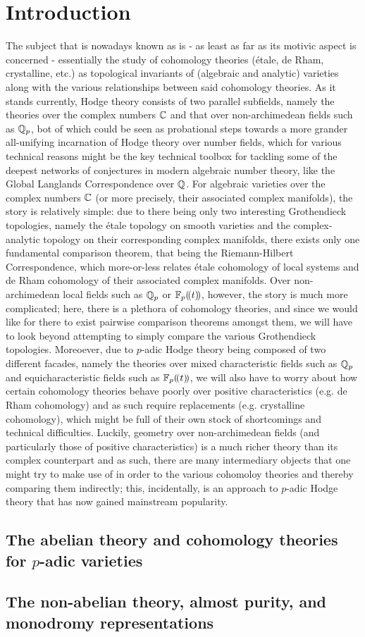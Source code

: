 \chapter{Introduction}
    The subject that is nowadays known as  is - as least as far as its motivic aspect is concerned - essentially the study of cohomology theories (\'etale, de Rham, crystalline, etc.) as topological invariants of (algebraic and analytic) varieties along with the various relationships between said cohomology theories. As it stands currently, Hodge theory consists of two parallel subfields, namely the theories over the complex numbers $\mathbb{C}$ and that over non-archimedean fields such as $\mathbb{Q}_p$, bot of which could be seen as probational steps towards a more grander all-unifying incarnation of Hodge theory over number fields, which for various technical reasons might be the key technical toolbox for tackling some of the deepest networks of conjectures in modern algebraic number theory, like the Global Langlands Correspondence over $\mathbb{Q}$. For algebraic varieties over the complex numbers $\mathbb{C}$ (or more precisely, their associated complex manifolds), the story is relatively simple: due to there being only two interesting Grothendieck topologies, namely the \'etale topology on smooth varieties and the complex-analytic topology on their corresponding complex manifolds, there exists only one fundamental comparison theorem, that being the Riemann-Hilbert Correspondence, which more-or-less relates \'etale cohomology of local systems and de Rham cohomology of their associated complex manifolds. Over non-archimedean local fields such as $\mathbb{Q}_p$ or $\mathbb{F}_p(\!(t)\!)$, however, the story is much more complicated; here, there is a plethora of cohomology theories, and since we would like for there to exist pairwise comparison theorems amongst them, we will have to look beyond attempting to simply compare the various Grothendieck topologies. Moreoever, due to $p$-adic Hodge theory being composed of two different facades, namely the theories over mixed characteristic fields such as $\mathbb{Q}_p$ and equicharacteristic fields such as $\mathbb{F}_p(\!(t)\!)$, we will also have to worry about how certain cohomology theories behave poorly over positive characteristics (e.g. de Rham cohomology) and as such require replacements (e.g. crystalline cohomology), which might be full of their own stock of shortcomings and technical difficulties. Luckily, geometry over non-archimedean fields (and particularly those of positive characteristics) is a much richer theory than its complex counterpart and as such, there are many intermediary objects that one might try to make use of in order to  the various cohomoloy theories and thereby comparing them indirectly; this, incidentally, is an approach to $p$-adic Hodge theory that has now gained mainstream popularity.
    
    \section{The abelian theory and cohomology theories for \texorpdfstring{$p$}{}-adic varieties}
    
    \section{The non-abelian theory, almost purity, and monodromy representations}